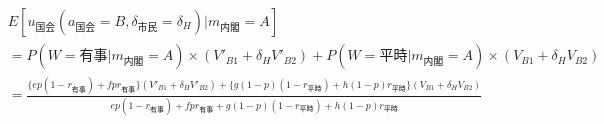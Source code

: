 \documentclass[main.tex]{subfiles}
\begin{document}
\begin{align*}
    & E[u_{国会}(a_{国会}=B, \delta_{市民}=\delta_H) | m_{内閣} = A  ]\\[0.5em]
    &= P(W=有事 | m_{内閣}=A) × (V'_{B1} + \delta_H V'_{B2}) + P(W=平時 | m_{内閣}=A) × (V_{B1} + \delta_H V_{B2})\\[0.5em]
    &= \frac{ \{ep(1-r_{有事}) +  fpr_{有事}\}(V'_{B1} + \delta_H V'_{B2}) +  \{g(1-p)(1-r_{平時}) + h(1-p)r_{平時}\}(V_{B1} + \delta_H V_{B2})  }{ ep(1-r_{有事}) + fpr_{有事} + g(1-p)(1-r_{平時}) + h(1-p)r_{平時} }
\end{align*}



\theendnotes
\end{document}
